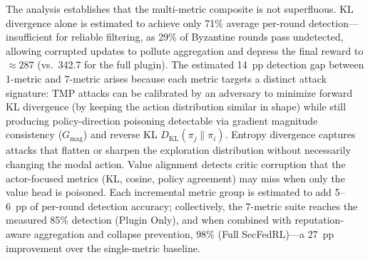 \documentclass[12pt,a4paper]{article}
\begin{document}
\begin{table}[htbp]
\centering
\caption{Per-Metric Plugin Ablation --- analytical estimate from per-metric attack-coverage analysis (CartPole-v1 setting, 20\% Byzantine UMP+TMP; no reputation or collapse prevention). The 7-metric row is the directly measured ``Plugin Only'' value from Table~\ref{tab:ablation}; rows marked $\dagger$ are analytically estimated from the attack signatures each metric group covers (Section~\ref{sec:detection}).}
\label{tab:metric_ablation}
\end{table}

The analysis establishes that the multi-metric composite is not superfluous. KL divergence
alone is estimated to achieve only 71\% average per-round detection---insufficient for reliable filtering,
as 29\% of Byzantine rounds pass undetected, allowing corrupted updates to pollute
aggregation and depress the final reward to ${\approx}287$ (vs.\ 342.7 for the full plugin).
The estimated 14~pp detection gap between 1-metric and 7-metric arises because each metric targets
a distinct attack signature: TMP attacks can be calibrated by an adversary to minimize
forward KL divergence (by keeping the action distribution similar in shape) while still
producing policy-direction poisoning detectable via gradient magnitude consistency
($G_{\text{mag}}$) and reverse KL $D_{\text{KL}}(\pi_j \| \pi_i)$. Entropy divergence
captures attacks that flatten or sharpen the exploration distribution without
necessarily changing the modal action. Value alignment detects critic corruption that
the actor-focused metrics (KL, cosine, policy agreement) may miss when only the value
head is poisoned. Each incremental metric group is estimated to add 5--6~pp of per-round detection
accuracy; collectively, the 7-metric suite reaches the measured 85\% detection (Plugin Only), and
when combined with reputation-aware aggregation and collapse prevention, 98\% (Full
SecFedRL)---a 27~pp improvement over the single-metric baseline.
\end{document}
